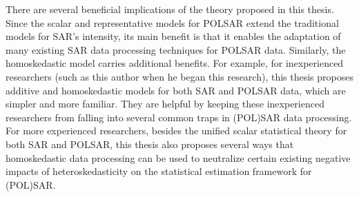 \begin{abstracts}
There are several beneficial implications of the theory proposed in this thesis. 
Since the scalar and representative models for POLSAR extend the traditional models for SAR's intensity,
  its main benefit is that it enables the adaptation of many existing SAR data processing techniques for POLSAR data.
Similarly, the homoskedastic model carries additional benefits.
For example, for inexperienced researchers (such as this author when he began this research),
  this thesis proposes additive and homoskedastic models for both SAR and POLSAR data,
  which are simpler and more familiar.
They are helpful by keeping these inexperienced researchers from falling into several common traps in (POL)SAR data processing.
For more experienced researchers, besides the unified scalar statistical theory for both SAR and POLSAR, 
  this thesis also proposes several ways that homoskedastic data processing can be used to neutralize certain existing negative impacts of heteroskedasticity on the statistical estimation framework for (POL)SAR.


\end{abstracts}
